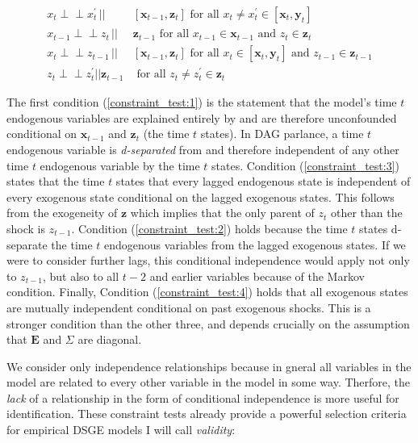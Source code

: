 \documentclass{article}
\def\indep{\perp \!\!\! \perp}
\begin{document}
\begin{align}
  x_t \indep x^{\prime}_{t} \,||\,& [\mathbf{x}_{t-1},\mathbf{z}_t] \text{ for all } x_t \neq x^{\prime}_{t} \in [\mathbf{x}_t, \mathbf{y}_t] \label{constraint_test:1} \\
  x_{t-1} \indep z_{t} \,||\,& \mathbf{z}_{t-1} \text{ for all } x_{t-1} \in \mathbf{x}_{t-1} \text{ and } z_{t} \in \mathbf{z}_t \label{constraint_test:3} \\
  x_t \indep z_{t-1} \,||\,& [\mathbf{x}_{t-1}, \mathbf{z}_t] \text{ for all } x_t \in [\mathbf{x}_t, \mathbf{y}_t] \text{ and } z_{t-1} \in \mathbf{z}_{t-1} \label{constraint_test:2} \\
  z_t \indep z^{\prime}_{t} || \mathbf{z}_{t-1} & \text{ for all } z_t \not = z^{\prime}_{t} \in \mathbf{z}_t \label{constraint_test:4}
\end{align}

The first condition (\ref{constraint_test:1}) is the statement that the model's time $t$ endogenous variables are explained entirely by and are therefore unconfounded conditional on $\mathbf{x}_{t-1}$ and $\mathbf{z}_t$ (the time $t$ states). In DAG parlance, a time $t$ endogenous variable is \textit{d-separated} from and therefore independent of any other time $t$ endogenous variable by the time $t$ states. Condition (\ref{constraint_test:3}) states that the time $t$ states that every lagged endogenous state is independent of every exogenous state conditional on the lagged exogenous states. This follows from the exogeneity of $\mathbf{z}$ which implies that the only parent of $z_t$ other than the shock is $z_{t-1}$. Condition (\ref{constraint_test:2}) holds because the time $t$ states d-separate the time $t$ endogenous variables from the lagged exogenous states. If we were to consider further lags, this conditional independence would apply not only to $z_{t-1}$, but also to all $t-2$ and earlier variables because of the Markov condition. Finally, Condition (\ref{constraint_test:4}) holds that all exogenous states are mutually independent conditional on past exogenous shocks. This is a stronger condition than the other three, and depends crucially on the assumption that $\mathbf{E}$ and $\Sigma$ are diagonal.

We consider only independence relationships because in gneral all variables in the model are related to every other variable in the model in some way. Therfore, the \textit{lack} of a relationship in the form of conditional independence is more useful for identification. These constraint tests already provide a powerful selection criteria for empirical DSGE models I will call \textit{validity}:
\end{document}
